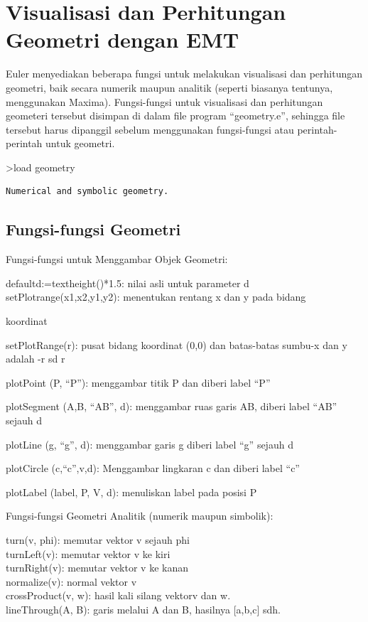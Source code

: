 \documentclass[
]{book}
\author{}
\date{}
\begin{document}
\frontmatter

\mainmatter
\chapter{Visualisasi dan Perhitungan Geometri dengan EMT}\label{visualisasi-dan-perhitungan-geometri-dengan-emt}

Euler menyediakan beberapa fungsi untuk melakukan visualisasi dan perhitungan geometri, baik secara numerik maupun analitik (seperti biasanya tentunya, menggunakan Maxima). Fungsi-fungsi untuk visualisasi dan perhitungan geometeri tersebut disimpan di dalam file program ``geometry.e'', sehingga file tersebut harus dipanggil sebelum menggunakan fungsi-fungsi atau perintah-perintah untuk geometri.

\textgreater load geometry

\begin{verbatim}
Numerical and symbolic geometry.
\end{verbatim}

\section{Fungsi-fungsi Geometri}\label{fungsi-fungsi-geometri}

Fungsi-fungsi untuk Menggambar Objek Geometri:

defaultd:=textheight()*1.5: nilai asli untuk parameter d\\
setPlotrange(x1,x2,y1,y2): menentukan rentang x dan y pada bidang

koordinat

setPlotRange(r): pusat bidang koordinat (0,0) dan batas-batas sumbu-x dan y adalah -r sd r

plotPoint (P, ``P''): menggambar titik P dan diberi label ``P''

plotSegment (A,B, ``AB'', d): menggambar ruas garis AB, diberi label ``AB'' sejauh d

plotLine (g, ``g'', d): menggambar garis g diberi label ``g'' sejauh d

plotCircle (c,``c'',v,d): Menggambar lingkaran c dan diberi label ``c''

plotLabel (label, P, V, d): menuliskan label pada posisi P

Fungsi-fungsi Geometri Analitik (numerik maupun simbolik):

turn(v, phi): memutar vektor v sejauh phi\\
turnLeft(v): memutar vektor v ke kiri\\
turnRight(v): memutar vektor v ke kanan\\
normalize(v): normal vektor v\\
crossProduct(v, w): hasil kali silang vektorv dan w.\\
lineThrough(A, B): garis melalui A dan B, hasilnya {[}a,b,c{]} sdh.
\end{document}

